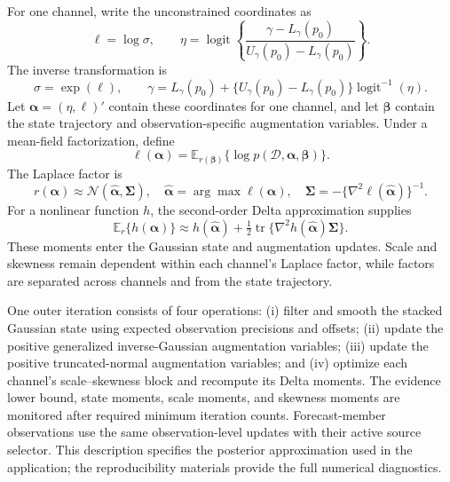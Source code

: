 For one channel, write the unconstrained coordinates as
\[
\ell=\log\sigma,
\qquad
\eta=\operatorname{logit}
\left\{\frac{\gamma-L_\gamma(p_0)}
{U_\gamma(p_0)-L_\gamma(p_0)}\right\}.
\]
The inverse transformation is
\[
\sigma=\exp(\ell),
\qquad
\gamma=L_\gamma(p_0)
+\{U_\gamma(p_0)-L_\gamma(p_0)\}
\operatorname{logit}^{-1}(\eta).
\]
Let $\boldsymbol\alpha=(\eta,\ell)'$ contain these coordinates for one
channel, and let $\boldsymbol\beta$ contain the state trajectory and
observation-specific augmentation variables. Under a mean-field
factorization, define
\[
\ell(\boldsymbol\alpha)=
\mathbb E_{r(\boldsymbol\beta)}
\{\log p(\mathcal D,\boldsymbol\alpha,\boldsymbol\beta)\}.
\]
The Laplace factor is
\[
r(\boldsymbol\alpha)\approx
\mathcal N(\widehat{\boldsymbol\alpha},\boldsymbol\Sigma),
\quad
\widehat{\boldsymbol\alpha}=\arg\max\ell(\boldsymbol\alpha),
\quad
\boldsymbol\Sigma=-\{\nabla^2\ell(\widehat{\boldsymbol\alpha})\}^{-1}.
\]
For a nonlinear function $h$, the second-order Delta approximation supplies
\[
\mathbb E_r\{h(\boldsymbol\alpha)\}\approx
h(\widehat{\boldsymbol\alpha})+
\tfrac12\operatorname{tr}
\{\nabla^2h(\widehat{\boldsymbol\alpha})\boldsymbol\Sigma\}.
\]
These moments enter the Gaussian state and augmentation updates. Scale and
skewness remain dependent within each channel's Laplace factor, while factors
are separated across channels and from the state trajectory.

One outer iteration consists of four operations: (i) filter and smooth the
stacked Gaussian state using expected observation precisions and offsets;
(ii) update the positive generalized inverse-Gaussian augmentation variables;
(iii) update the positive truncated-normal augmentation variables; and (iv)
optimize each channel's scale--skewness block and recompute its Delta moments.
The evidence lower bound, state moments, scale moments, and skewness moments
are monitored after required minimum iteration counts. Forecast-member
observations use the same observation-level updates with their active source
selector. This description specifies the posterior approximation used in the
application; the reproducibility materials provide the full numerical
diagnostics.
